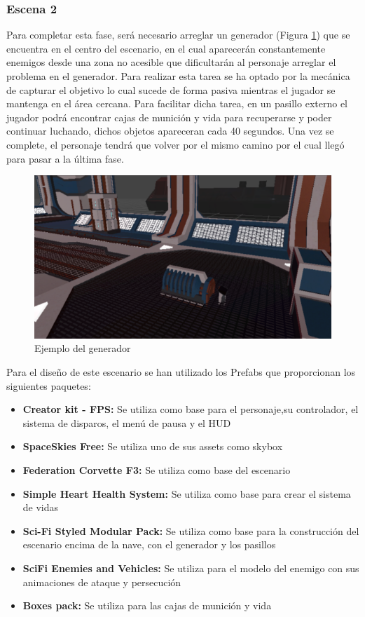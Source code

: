 \subsubsection{Escena 2}
Para completar esta fase, será necesario arreglar un generador (Figura \ref{fig:Generador}) que se encuentra en el centro del escenario, en el cual aparecerán constantemente enemigos desde una zona no acesible que dificultarán al personaje arreglar el problema en el generador. Para realizar esta tarea se ha optado por la mecánica de capturar el objetivo lo cual sucede de forma pasiva mientras el jugador se mantenga en el área cercana. Para facilitar dicha tarea, en un pasillo externo el jugador podrá encontrar cajas de munición y vida para recuperarse y poder continuar luchando, dichos objetos apareceran cada 40 segundos. Una vez se complete, el personaje tendrá que volver por el mismo camino por el cual llegó para pasar a la última fase.

\begin{figure}[H]
	\centering
	\includegraphics[scale=0.75]{imagenes/Generador.png}
	\caption{\label{fig:Generador}Ejemplo del generador}
\end{figure}

Para el diseño de este escenario se han utilizado los Prefabs que proporcionan los siguientes paquetes:
\begin{itemize}
	\item \textbf{Creator kit - FPS:} Se utiliza como base para el personaje,su controlador, el sistema de disparos, el menú de pausa y el HUD
	\item \textbf{SpaceSkies Free:} Se utiliza uno de sus assets como skybox
	\item \textbf{Federation Corvette F3:} Se utiliza como base del escenario
	\item \textbf{Simple Heart Health System:} Se utiliza como base para crear el sistema de vidas
	\item \textbf{Sci-Fi Styled Modular Pack:} Se utiliza como base para la construcción del escenario encima de la nave, con el generador y los pasillos
	\item \textbf{SciFi Enemies and Vehicles:} Se utiliza para el modelo del enemigo con sus animaciones de ataque y persecución
	\item \textbf{Boxes pack:} Se utiliza para las cajas de munición y vida
\end{itemize}


